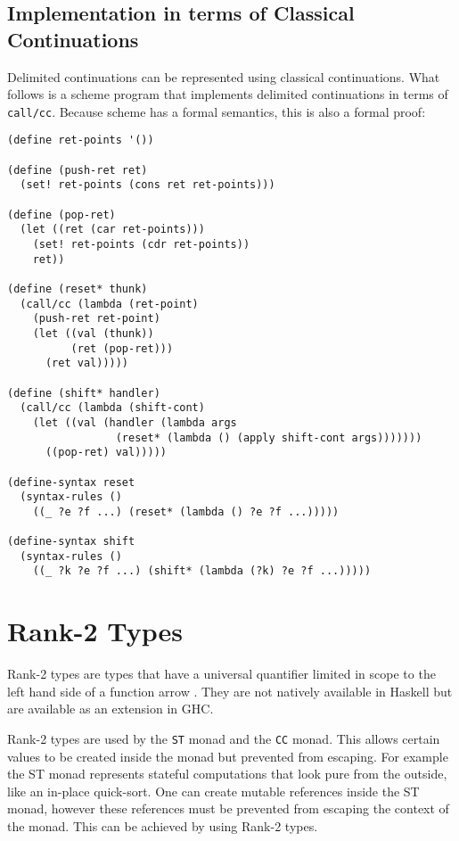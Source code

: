 \documentclass[]{article}
\newcommand{\function}[1]{\texttt{#1}}
\newcommand{\type}[1]{\texttt{#1}}
\begin{document}
\subsection{Implementation in terms of Classical Continuations}
Delimited continuations can be represented using classical continuations. What
follows is a scheme program that implements delimited continuations in terms
of \function{call/cc}. Because scheme has a formal semantics, this is also a
formal proof:

\begin{verbatim}
(define ret-points '())

(define (push-ret ret)
  (set! ret-points (cons ret ret-points)))

(define (pop-ret)
  (let ((ret (car ret-points)))
    (set! ret-points (cdr ret-points))
    ret))

(define (reset* thunk)
  (call/cc (lambda (ret-point)
    (push-ret ret-point)
    (let ((val (thunk))
          (ret (pop-ret)))
      (ret val)))))

(define (shift* handler)
  (call/cc (lambda (shift-cont)
    (let ((val (handler (lambda args
                 (reset* (lambda () (apply shift-cont args)))))))
      ((pop-ret) val)))))

(define-syntax reset
  (syntax-rules ()
    ((_ ?e ?f ...) (reset* (lambda () ?e ?f ...)))))

(define-syntax shift
  (syntax-rules ()
    ((_ ?k ?e ?f ...) (shift* (lambda (?k) ?e ?f ...)))))
\end{verbatim}

\section{Rank-2 Types}
\label{discussion:rank2}

Rank-2 types are types that have a universal quantifier limited in scope to
the left hand side of a function arrow \cite{Wikibook:Haskell}. They are not
natively available in Haskell but are available as an extension in GHC.

Rank-2 types are used by the \type{ST} monad and the \type{CC} monad. This
allows certain values to be created inside the monad but prevented from
escaping. For example the ST monad represents stateful computations that look
pure from the outside, like an in-place quick-sort. One can create mutable
references inside the ST monad, however these references must be prevented
from escaping the context of the monad. This can be achieved by using Rank-2
types.
\end{document}
